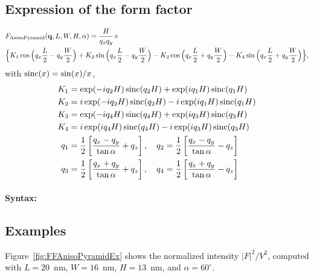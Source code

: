 \subsection{Expression of the form factor}
\begin{align*}
&F_{\rm{AnisoPyramid}}(\mathbf{q}, L, W, H, \alpha)=
\frac{H}{q_xq_y} \times \\
&\Big\{
K_1\cos\Big(q_x \frac{L}{2} -q_y \frac{W}{2}\Big)+  K_2 \sin \Big (q_x
\frac{L}{2}- q_y \frac{W}{2}\Big) - K_3 \cos \Big (q_x \frac{L}{2} +q_y \frac{W}{2}\Big)-
K_4 \sin \Big (q_x \frac{L}{2} + q_y \frac{W}{2}\Big)
\Big\},
\end{align*}
with $\operatorname{sinc}(x)=\sin(x)/x$,
\begin{align*}
K_1 &= \exp(-i q_2 H) \operatorname{sinc}(q_2 H) + \exp(iq_1 H) \operatorname{sinc}(q_1 H) \\
K_2 &= i \exp(-iq_2 H) \operatorname{sinc}(q_2 H) -i \exp(iq_1 H) \operatorname{sinc}(q_1 H) \\
K_3 &= \exp(-iq_4 H) \operatorname{sinc}(q_4 H) + \exp(iq_3 H) \operatorname{sinc}(q_3 H) \\
K_4 &= i \exp(i q_4 H) \operatorname{sinc}(q_4 H) -i \exp(iq_3 H) \operatorname{sinc}(q_3 H)\\
q_1 &= \frac{1}{2}\left[\frac{q_x -q_y}{\tan \alpha} +q_z \right],\quad q_2 = \frac{1}{2}\left[\frac{q_x -q_y}{\tan \alpha} -q_z \right]\\
q_3 &= \frac{1}{2}\left[\frac{q_x +q_y}{\tan \alpha} +q_z \right] , \quad q_4 = \frac{1}{2}\left[\frac{q_x +q_y}{\tan \alpha} -q_z \right]
\end{align*}

\paragraph{Syntax:} 

\subsection{Examples}
Figure~\ref{fig:FFAnisoPyramidEx} shows the normalized intensity
$|F|^2/V^2$, computed with $L=20$~nm, $W=16$~nm, $H=13$~nm, and
$\alpha=60^{\circ}$.

